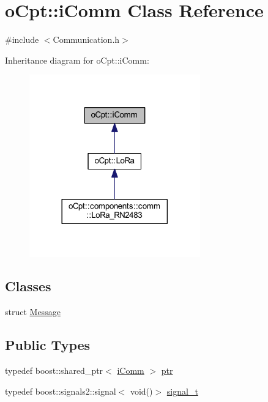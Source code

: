 \hypertarget{classo_cpt_1_1i_comm}{}\section{o\+Cpt\+:\+:i\+Comm Class Reference}
\label{classo_cpt_1_1i_comm}


{\ttfamily \#include $<$Communication.\+h$>$}



Inheritance diagram for o\+Cpt\+:\+:i\+Comm\+:
\nopagebreak
\begin{figure}[H]
\begin{center}
\leavevmode
\includegraphics[width=209pt]{classo_cpt_1_1i_comm__inherit__graph}
\end{center}
\end{figure}
\subsection*{Classes}
\begin{DoxyCompactItemize}
\item 
struct \hyperlink{structo_cpt_1_1i_comm_1_1_message}{Message}
\end{DoxyCompactItemize}
\subsection*{Public Types}
\begin{DoxyCompactItemize}
\item 
typedef boost\+::shared\+\_\+ptr$<$ \hyperlink{classo_cpt_1_1i_comm}{i\+Comm} $>$ \hyperlink{classo_cpt_1_1i_comm_af0c655f143251b7d03fcd98f89637228}{ptr}
\item 
typedef boost\+::signals2\+::signal$<$ void()$>$ \hyperlink{classo_cpt_1_1i_comm_a53ead13a50cbf583520f670dcd158e59}{signal\+\_\+t}
\end{DoxyCompactItemize}
